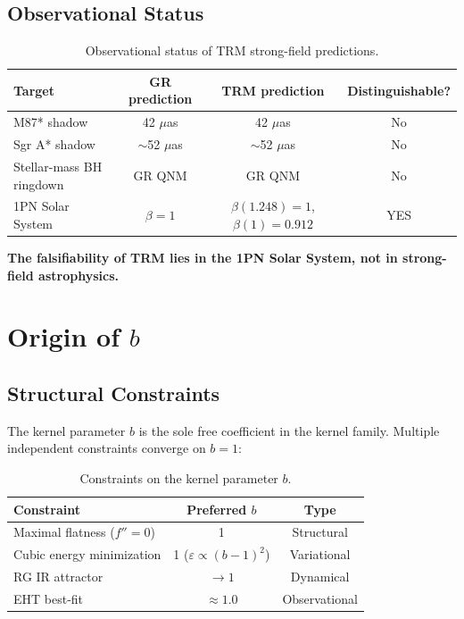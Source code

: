 \documentclass[12pt]{article}
\begin{document}
\subsection{Observational Status}

\begin{table}[h]
\centering
\begin{tabular}{l|c|c|c}
Target & GR prediction & TRM prediction & Distinguishable? \\
\midrule
M87* shadow & 42 $\mu$as & 42 $\mu$as & No \\
Sgr A* shadow & $\sim$52 $\mu$as & $\sim$52 $\mu$as & No \\
Stellar-mass BH ringdown & GR QNM & GR QNM & No \\
1PN Solar System & $\beta=1$ & $\beta(1.248)=1$, $\beta(1)=0.912$ & YES \\
\end{tabular}
\caption{Observational status of TRM strong-field predictions.}
\label{tab:obs}
\end{table}

\textbf{The falsifiability of TRM lies in the 1PN Solar System, not in strong-field astrophysics.}

\section{Origin of $b$}
\label{sec:origin_b}

\subsection{Structural Constraints}

The kernel parameter $b$ is the sole free coefficient in the kernel family. Multiple independent constraints converge on $b=1$:

\begin{table}[h]
\centering
\begin{tabular}{l|c|c}
Constraint & Preferred $b$ & Type \\
\midrule
Maximal flatness ($f''=0$) & 1 & Structural \\
Cubic energy minimization & 1 ($\varepsilon \propto (b-1)^2$) & Variational \\
RG IR attractor & $\to 1$ & Dynamical \\
EHT best-fit & $\approx 1.0$ & Observational \\
\end{tabular}
\caption{Constraints on the kernel parameter $b$.}
\label{tab:bconstraints}
\end{table}
\end{document}
